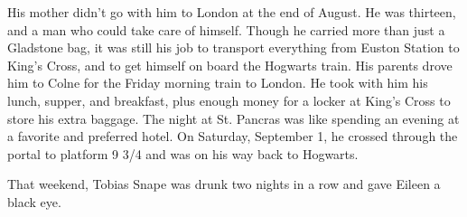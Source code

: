 \documentclass[a4paper,11pt]{article}
\begin{document}
His mother didn't go with him to London at the end of August. He was thirteen, and a man who could take care of himself. Though he carried more than just a Gladstone bag, it was still his job to transport everything from Euston Station to King's Cross, and to get himself on board the Hogwarts train. His parents drove him to Colne for the Friday morning train to London. He took with him his lunch, supper, and breakfast, plus enough money for a locker at King's Cross to store his extra baggage. The night at St. Pancras was like spending an evening at a favorite and preferred hotel. On Saturday, September 1, he crossed through the portal to platform 9 3/4 and was on his way back to Hogwarts.

That weekend, Tobias Snape was drunk two nights in a row and gave Eileen a black eye.
\end{document}
